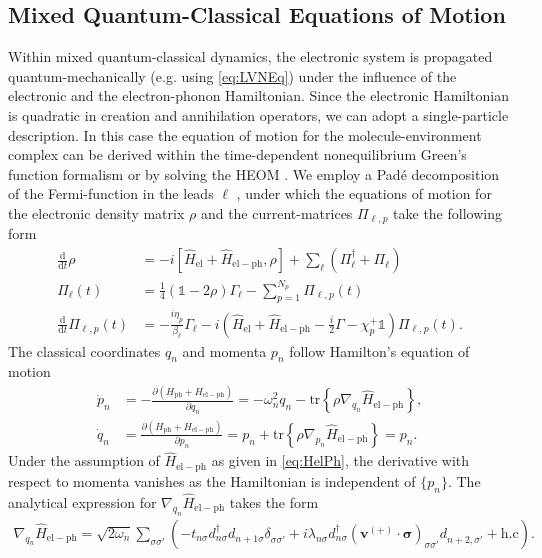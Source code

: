 \documentclass{article}
\newcommand{\dif}{\mathrm{d}}
\renewcommand{\vec}[1]{\mathbf{#1}}
\newcommand{\pdagger}{{\phantom{\dagger}}}
\newcommand{\tr}[1]{\mathrm{tr}\left\{#1\right\}}
\begin{document}
\subsection{Mixed Quantum-Classical Equations of Motion}
Within mixed quantum-classical dynamics, the electronic system is propagated quantum-mechanically (e.g. using \cref{eq:LVNEq}) under the influence of the electronic and the electron-phonon Hamiltonian.
Since the electronic Hamiltonian is quadratic in creation and annihilation operators, we can adopt a single-particle description. In this case the equation of motion for the molecule-environment complex can be derived within the time-dependent nonequilibrium Green's function formalism or by solving the HEOM \cite{zheng2007time}. 
We employ a Pad\'{e} decomposition of the Fermi-function in the leads $\ell$ \cite{zheng2007time,hu2010communication}, under which the equations of motion for the electronic density matrix $\rho$ and the current-matrices $\Pi_{\ell,p}$ take the following form
\begin{align}
	\frac{\dif}{\dif t}\rho &= -i[\hat{H}_\mathrm{el}+\hat{H}_\mathrm{el-ph},\rho] + \sum_\ell (\Pi_\ell^\dagger + \Pi_\ell^{\phantom{\dagger}}) \label{eq:NI_HEOM_1}\\
	\Pi_\ell(t) &= \frac{1}{4}(\mathds{1}-2\rho)\Gamma_\ell-\sum_{p=1}^{N_p} \Pi_{\ell,p}(t)\label{eq:NI_HEOM_2}\\
	\frac{\dif}{\dif t} \Pi_{\ell,p}(t) &= -\frac{i\eta_p}{\beta_\ell}\Gamma_\ell - i\left(\hat{H}_\mathrm{el}+\hat{H}_\mathrm{el-ph}-\frac{i}{2}\Gamma-\chi_p^+\mathds{1}\right)\Pi_{\ell,p}(t).\label{eq:NI_HEOM_3}	
\end{align}
The classical coordinates $q_n$ and momenta $p_n$ follow Hamilton's equation of motion
\begin{align}
	\dot{p}_n &= -\frac{\partial (H_\mathrm{ph}+H_\mathrm{el-ph})}{\partial q_n} = -\omega^2_n q_n - \tr{\rho \nabla_{q_n}\hat{H}_\mathrm{el-ph}},\label{eq:Hamilton_EOM_1} \\
	\dot{q}_n &= \frac{\partial (H_\mathrm{ph}+H_\mathrm{el-ph})}{\partial p_n} = p_n + \tr{\rho \nabla_{p_n}\hat{H}_\mathrm{el-ph}} = p_n.\label{eq:Hamilton_EOM_2}
\end{align}
Under the assumption of $\hat{H}_\mathrm{el-ph}$ as given in \cref{eq:HelPh}, the derivative with respect to momenta vanishes as the Hamiltonian is independent of $\{p_n\}$. The analytical expression for $\nabla_{q_n}\hat{H}_\mathrm{el-ph}$ takes the form
\begin{align}
	\nabla_{q_n}\hat{H}_\mathrm{el-ph} = \sqrt{2\omega_n}\sum_{\sigma\sigma'} (-t_{n\sigma}^\pdagger d_{n\sigma}^\dagger d_{n+1\sigma}^\pdagger \delta_{\sigma\sigma'}^\pdagger + i\lambda_{n\sigma}^\pdagger d_{n\sigma}^\dagger (\vec{v}^{(+)}\cdot \bm{\sigma})_{\sigma\sigma'}^\pdagger d_{n+2,\sigma'}^\pdagger + \mathrm{h.c}).
\end{align}
\end{document}
